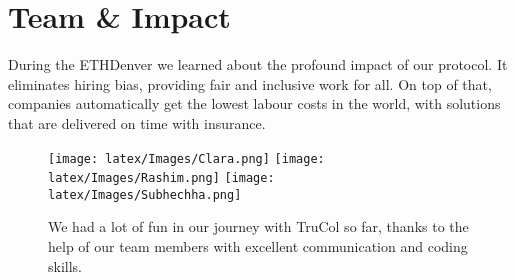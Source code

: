 \vspace{-0.16cm}
\section{Team \& Impact}
\vspace{-0.15cm}
During the ETHDenver we learned about the profound impact of our protocol. It eliminates hiring bias, providing fair and inclusive work for all. On top of that, companies automatically get the lowest labour costs in the world, with solutions that are delivered on time with insurance.
\begin{figure}[H]
    \centering
    \texttt{[image: latex/Images/Clara.png]}\hfill
    \texttt{[image: latex/Images/Rashim.png]}\hfill
    \texttt{[image: latex/Images/Subhechha.png]}\hfill
    \caption*{We had a lot of fun in our journey with TruCol so far, thanks to the help of our team members with excellent communication and coding skills.}
\end{figure}
